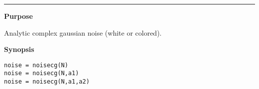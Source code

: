 

\hspace*{-1.6cm}{\Large \bf noisecg}

\vspace*{-.4cm}
\hspace*{-1.6cm}\rule[0in]{16.5cm}{.02cm}
\vspace*{.2cm}



{\bf \large {}\selectfont Purpose}\\
\hspace*{1.5cm}
\begin{minipage}[t]{13.5cm}
Analytic complex gaussian noise (white or colored).
\end{minipage}
\vspace*{.5cm}


{\bf \large {}\selectfont Synopsis}\\
\hspace*{1.5cm}
\begin{minipage}[t]{13.5cm}
\begin{verbatim}
noise = noisecg(N)
noise = noisecg(N,a1)
noise = noisecg(N,a1,a2)
\end{verbatim}
\end{minipage}
\vspace*{.5cm}


